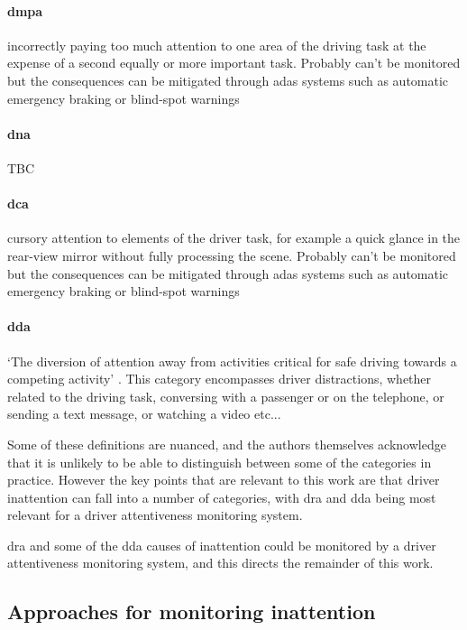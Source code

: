 \documentclass[11pt, parskip=half*,twoside=false]{scrbook}
\begin{document}
\paragraph{\gls{dmpa}} incorrectly paying too much attention to one area of the driving task at the expense of a second equally or more important task. Probably can't be monitored but the consequences can be mitigated through \gls{adas} systems such as automatic emergency braking or blind-spot warnings

\paragraph{\gls{dna}}  TBC

\paragraph{\gls{dca}} cursory attention to elements of the driver task, for example a quick glance in the rear-view mirror without fully processing the scene. Probably can't be monitored but the consequences can be mitigated through \gls{adas} systems such as automatic emergency braking or blind-spot warnings

\paragraph{\gls{dda}} `The diversion of attention away from activities critical for safe driving towards a competing activity' \citep{reganDriverDistractionDriver2011}. This category encompasses driver distractions, whether related to the driving task, conversing with a passenger or on the telephone, or sending a text message, or watching a video etc...  

Some of these definitions are nuanced, and the authors themselves acknowledge that it is unlikely to be able to distinguish between some of the categories in practice. However the key points that are relevant to this work are that driver inattention can fall into a number of categories, with \gls{dra} and \gls{dda} being most relevant for a driver attentiveness monitoring system.

\gls{dra} and some of the \gls{dda} causes of inattention could be monitored by a driver attentiveness monitoring system, and this directs the remainder of this work.


\subsection{Approaches for monitoring inattention} \label{ssec:approaches}
\end{document}
